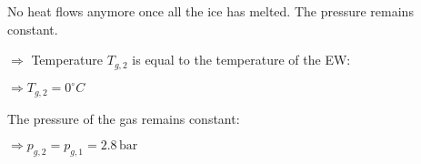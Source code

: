 No heat flows anymore once all the ice has melted. The pressure remains constant.  

\( \Rightarrow \) Temperature \( T_{g,2} \) is equal to the temperature of the EW:  

\( \Rightarrow T_{g,2} = 0^\circ C \)  

The pressure of the gas remains constant:  

\( \Rightarrow p_{g,2} = p_{g,1} = 2.8 \, \text{bar} \)